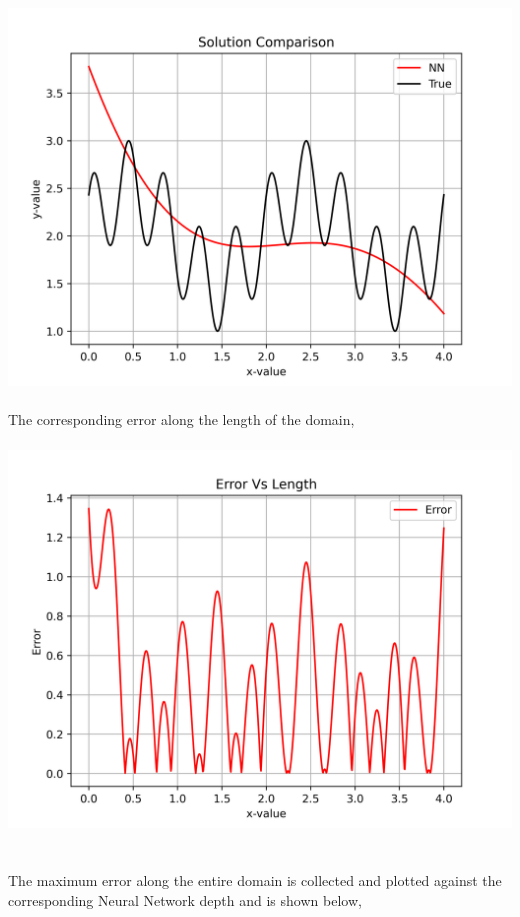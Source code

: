 \documentclass[a4paper, 12pt]{report}
\def\size{0.92}
\begin{document}
\begin{center}
\\~\\\includegraphics[scale=\size]{depthsol1.png}
\\~\\The corresponding error along the length of the domain,
\\~\\\includegraphics[scale=\size]{deptherr1.png}
\\~\\~\\The maximum error along the entire domain is collected and plotted against the corresponding Neural Network depth and is shown below,

\end{center}
\end{document}
